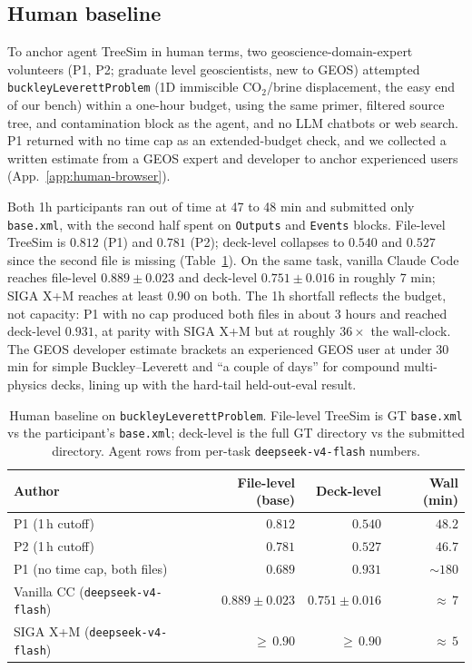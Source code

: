 \documentclass{article}
\begin{document}
\subsection{Human baseline}
\label{subsec:human-baseline}

To anchor agent TreeSim in human terms, two geoscience-domain-expert volunteers (P1, P2; graduate level geoscientists, new to GEOS) attempted \texttt{buckleyLeverettProblem} (1D immiscible CO$_2$/brine displacement, the easy end of our bench) within a one-hour budget, using the same primer, filtered source tree, and contamination block as the agent, and no LLM chatbots or web search. P1 returned with no time cap as an extended-budget check, and we collected a written estimate from a GEOS expert and developer to anchor experienced users (App.~\ref{app:human-browser}).

Both 1h participants ran out of time at 47 to 48 min and submitted only \texttt{base.xml}, with the second half spent on \texttt{Outputs} and \texttt{Events} blocks. File-level TreeSim is $0.812$ (P1) and $0.781$ (P2); deck-level collapses to $0.540$ and $0.527$ since the second file is missing (Table~\ref{tab:human-baseline}). On the same task, vanilla Claude Code reaches file-level $0.889 \pm 0.023$ and deck-level $0.751 \pm 0.016$ in roughly 7 min; SIGA X+M reaches at least $0.90$ on both. The 1h shortfall reflects the budget, not capacity: P1 with no cap produced both files in about 3 hours and reached deck-level $\mathbf{0.931}$, at parity with SIGA X+M but at roughly $36\times$ the wall-clock. The GEOS developer estimate brackets an experienced GEOS user at under 30 min for simple Buckley--Leverett and ``a couple of days'' for compound multi-physics decks, lining up with the hard-tail held-out-eval result.

\begin{table}[h]
  \caption{Human baseline on \texttt{buckleyLeverettProblem}. File-level TreeSim is GT \texttt{base.xml} vs the participant's \texttt{base.xml}; deck-level is the full GT directory vs the submitted directory. Agent rows from per-task \texttt{deepseek-v4-flash} numbers.}
  \label{tab:human-baseline}
  \centering
  \small
  \begin{tabular}{lrrr}
    \toprule
    \textbf{Author} & \textbf{File-level (base)} & \textbf{Deck-level} & \textbf{Wall (min)} \\
    \midrule
    P1 (1\,h cutoff)                          & $0.812$            & $0.540$            & $48.2$ \\
    P2 (1\,h cutoff)                          & $0.781$            & $0.527$            & $46.7$ \\
    P1 (no time cap, both files)              & $0.689$            & $0.931$            & ${\sim}180$ \\
    Vanilla CC (\texttt{deepseek-v4-flash})   & $0.889 \pm 0.023$  & $0.751 \pm 0.016$  & ${\approx}\,7$ \\
    SIGA X+M (\texttt{deepseek-v4-flash})     & ${\geq}\,0.90$     & ${\geq}\,0.90$     & ${\approx}\,5$ \\
    \bottomrule
  \end{tabular}
\end{table}
\end{document}
